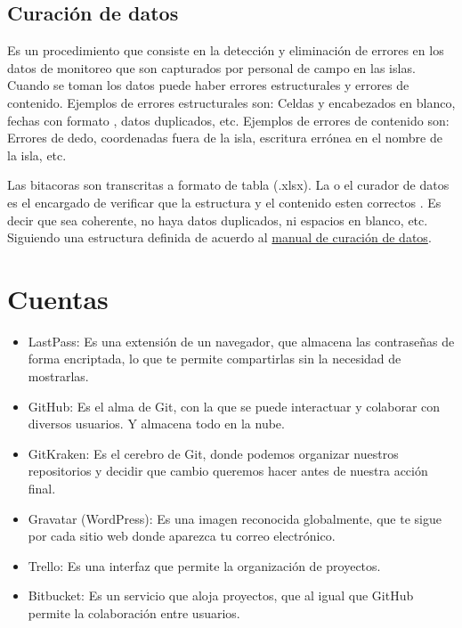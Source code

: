 \documentclass[12pt,letterpaper]{article}
\begin{document}
\subsection*{Curación de datos}
Es un procedimiento que consiste en la detección y eliminación de errores en los datos de monitoreo
que son capturados por personal de campo en las islas.  Cuando se toman los datos puede haber
errores estructurales y errores de contenido.  Ejemplos de errores estructurales son: Celdas  y
encabezados en blanco, fechas con formato , datos duplicados, etc.  Ejemplos de errores de contenido
son: Errores de dedo, coordenadas fuera de la isla, escritura errónea en el nombre de la isla, etc.

Las bitacoras son transcritas a formato de tabla (.xlsx). La o el curador de datos es el encargado
de verificar que la estructura y el contenido esten correctos \citep{it_user_2020}. Es decir que sea
coherente, no haya datos duplicados, ni espacios en blanco, etc. Siguiendo una estructura definida
de acuerdo al \href{https://drive.google.com/drive/folders/1X-EdWtD6sxItwKmCyGpviCt85IvexRxo}{manual de
curación de datos}.

\section*{Cuentas}
\begin{itemize}
\item LastPass: Es una extensión de un navegador, que almacena las contraseñas de forma encriptada,
lo que te permite compartirlas sin la necesidad de mostrarlas.
\item GitHub: Es el alma de Git, con la que se puede interactuar y colaborar con diversos usuarios.
Y almacena todo en la nube.
\item GitKraken: Es el cerebro de Git, donde podemos organizar nuestros repositorios y decidir que
cambio queremos hacer antes de nuestra acción final.
\item Gravatar (WordPress): Es una imagen reconocida globalmente, que te sigue por cada sitio web
donde aparezca tu correo electrónico.
\item Trello: Es una interfaz que permite la organización de proyectos.
\item Bitbucket: Es un servicio que aloja proyectos, que al igual que GitHub permite la colaboración
entre usuarios.
\end{itemize}

 

\end{document}
